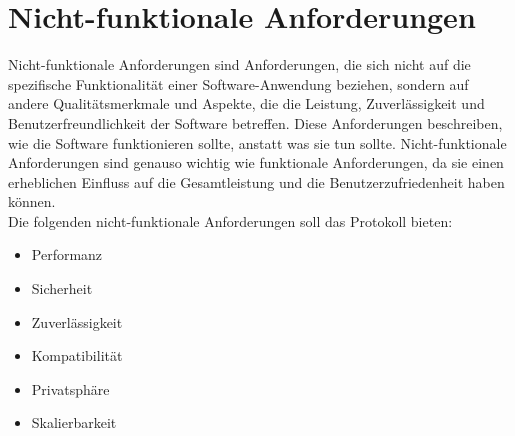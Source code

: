 \section{Nicht-funktionale Anforderungen}


Nicht-funktionale Anforderungen sind Anforderungen, die sich nicht auf die 
spezifische Funktionalität einer Software-Anwendung beziehen, sondern auf andere Qualitätsmerkmale 
und Aspekte, die die Leistung, Zuverlässigkeit und Benutzerfreundlichkeit der Software betreffen. 
Diese Anforderungen beschreiben, wie die Software funktionieren sollte, anstatt was sie tun sollte. 
Nicht-funktionale Anforderungen sind genauso wichtig wie funktionale Anforderungen, da sie einen 
erheblichen Einfluss auf die Gesamtleistung und die Benutzerzufriedenheit haben können.
\\
Die folgenden nicht-funktionale Anforderungen soll das Protokoll bieten:

\begin{itemize}
    \item Performanz
    \item Sicherheit
    \item Zuverlässigkeit
    \item Kompatibilität
    \item Privatsphäre
    \item Skalierbarkeit
\end{itemize}